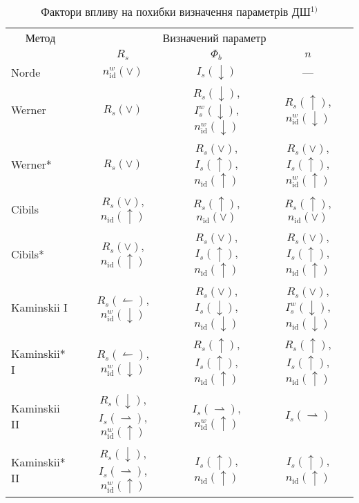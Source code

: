 \begin{table}
\caption{\label{tabIF}Фактори впливу на похибки визначення параметрів ДШ$^{1)}$
}
\centering
\small
\begin{tabular}{|l|c|c|c|}
\hline
\multicolumn{1}{|c|}{Метод}&\multicolumn{3}{c|}{Визначений параметр}\\
\cline{2-4}
 &$R_s$&$\Phi_b$&$n$\\
\hhline{|====|}
Norde &$n_\mathrm{id}^w(\vee)$&$I_s(\downarrow)$&---\\
\hline
Werner &$R_s(\vee)$&$R_s(\downarrow)$, $I_s^w(\downarrow)$, $n_\mathrm{id}^w(\downarrow)$&$R_s(\uparrow)$, $n_\mathrm{id}^w(\downarrow)$\\
\hline
Werner* &$R_s(\vee)$&$R_s(\vee)$, $I_s(\uparrow)$, $n_\mathrm{id}(\uparrow)$&$R_s(\vee)$, $I_s(\uparrow)$, $n_\mathrm{id}^w(\uparrow)$\\
\hline
Cibils &$R_s(\vee)$, $n_\mathrm{id}(\uparrow)$&$R_s(\uparrow)$, $n_\mathrm{id}(\vee)$& $R_s(\uparrow)$, $n_\mathrm{id}(\vee)$\\
\hline
Cibils* &$R_s(\vee)$, $n_\mathrm{id}(\uparrow)$&$R_s(\vee)$, $I_s(\uparrow)$, $n_\mathrm{id}(\uparrow)$& $R_s(\vee)$, $I_s(\uparrow)$, $n_\mathrm{id}(\uparrow)$\\
\hline
Kaminskii I&$R_s(\leftharpoonup)$, $n_\mathrm{id}^w(\downarrow)$&$R_s(\vee)$, $I_s(\downarrow)$, $n_\mathrm{id}(\downarrow)$& $R_s(\vee)$, $I_s^w(\downarrow)$, $n_\mathrm{id}(\downarrow)$\\
\hline
Kaminskii* I&$R_s(\leftharpoonup)$, $n_\mathrm{id}^w(\downarrow)$&$R_s(\uparrow)$, $I_s(\uparrow)$, $n_\mathrm{id}(\uparrow)$& $R_s(\uparrow)$, $I_s(\uparrow)$, $n_\mathrm{id}(\uparrow)$\\
\hline
Kaminskii II&$R_s(\downarrow)$, $I_s(\rightharpoonup)$, $n_\mathrm{id}^w(\uparrow)$&$I_s(\rightharpoonup)$, $n_\mathrm{id}^w(\uparrow)$& $I_s(\rightharpoonup)$\\
\hline
Kaminskii* II&$R_s(\downarrow)$, $I_s(\rightharpoonup)$, $n_\mathrm{id}^w(\uparrow)$&$I_s(\uparrow)$, $n_\mathrm{id}(\uparrow)$& $I_s(\uparrow)$, $n_\mathrm{id}(\uparrow)$\\

\end{tabular}
\end{table}
